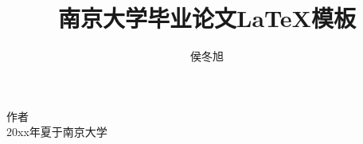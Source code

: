 \documentclass[winfonts,phd,twoside]{njuthesis}
\title{南京大学毕业论文\LaTeX 模板}
\author{侯冬旭}
\institute{南京大学}
\begin{document}

\maketitle
\makeenglishtitle


\frontmatter

\begin{abstract}
\lipsum[1-2]


\end{abstract}

\begin{englishabstract}
\lipsum[2]


\end{englishabstract}

%
\begin{preface}
\lipsum[1]
\vspace{1cm}
\begin{flushright}
作者\\
20xx年夏于南京大学
\end{flushright}

\end{preface}

\tableofcontents

\listoffigures

\listoftables
\end{document}

